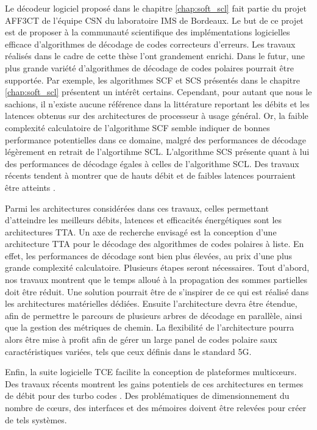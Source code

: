 Le décodeur logiciel proposé dans le chapitre \ref{chap:soft_scl} fait partie du projet AFF3CT de l'équipe CSN du laboratoire IMS de Bordeaux. Le but de ce projet est de proposer à la communauté scientifique des implémentations logicielles efficace d'algorithmes de décodage de codes correcteurs d'erreurs. Les travaux réalisés dans le cadre de cette thèse l'ont grandement enrichi. Dans le futur, une plus grande variété d'algorithmes de décodage de codes polaires pourrait être supportée. Par exemple, les algorithmes SCF et SCS présentés dans le chapitre \ref{chap:soft_scl} présentent un intérêt certains. Cependant, pour autant que nous le sachions, il n'existe aucune référence dans la littérature reportant les débits et les latences obtenus sur des architectures de processeur à usage général. Or, la faible complexité calculatoire de l'algorithme SCF semble indiquer de bonnes performance potentielles dans ce domaine, malgré des performances de décodage légèrement en retrait de l'algortihme SCL. L'algorithme SCS présente quant à lui des performances de décodage égales à celles de l'algorithme SCL. Des travaux récents tendent à montrer que de hauts débit et de faibles latences pourraient être atteints \cite{8351832}.

Parmi les architectures considérées dans ces travaux, celles permettant d'atteindre les meilleurs débits, latences et efficacités énergétiques sont les architectures TTA. Un axe de recherche envisagé est la conception d'une architecture TTA pour le décodage des algorithmes de codes polaires à liste. En effet, les performances de décodage sont bien plus élevées, au prix d'une plus grande complexité calculatoire. Plusieurs étapes seront nécessaires. Tout d'abord, nos travaux montrent que le temps alloué à la propagation des sommes partielles doit être réduit. Une solution pourrait être de s'inspirer de ce qui est réalisé dans les architectures matérielles dédiées. Ensuite l'architecture devra être étendue, afin de permettre le parcours de plusieurs arbres de décodage en parallèle, ainsi que la gestion des métriques de chemin. La flexibilité de l'architecture pourra alors être mise à profit afin de gérer un large panel de codes polaire saux caractéristiques variées, tels que ceux définis dans le standard 5G.

Enfin, la suite logicielle TCE facilite la conception de plateformes multicœurs. Des travaux récents montrent les gains potentiels de ces architectures en termes de débit pour des turbo codes \cite{kultala_turbo_2013}. Des problématiques de dimensionnement du nombre de cœurs, des interfaces et des mémoires doivent être relevées pour créer de tels systèmes.
